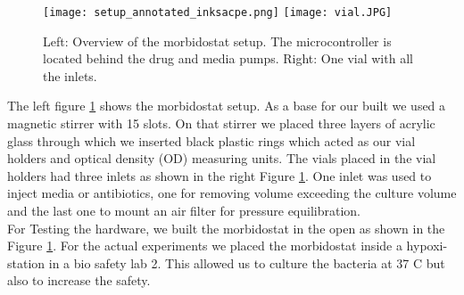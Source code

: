 \begin{figure}
	\texttt{[image: setup\_annotated\_inksacpe.png]}
	\texttt{[image: vial.JPG]}
	\caption{Left: Overview of the morbidostat setup. The microcontroller is located behind the drug and media pumps. Right: One vial with all the inlets.}
	\label{figure:morbidostat_setup}
\end{figure}  
The left figure \ref{figure:morbidostat_setup} shows the morbidostat setup.
As a base for our built we used a magnetic stirrer with 15 slots. On that stirrer we placed three layers of acrylic glass through which we inserted black plastic rings which acted as our vial holders and optical density (OD) measuring units. 
The vials placed in the vial holders had three inlets as shown in the right Figure \ref{figure:morbidostat_setup}. One inlet was used to inject media or antibiotics, one for removing volume exceeding the culture volume and the last one to mount an air filter for pressure equilibration. \\
For Testing the hardware, we built the morbidostat in the open as shown in the Figure \ref{figure:morbidostat_setup}. For the actual experiments we placed the morbidostat inside a hypoxi-station in a bio safety lab 2. This allowed us to culture the bacteria at 37 \degree C but also to increase the safety. 


